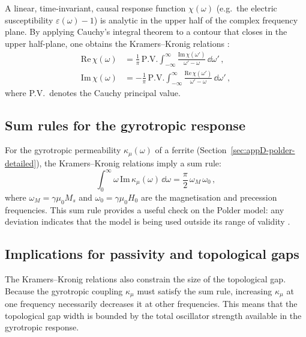 A linear, time-invariant, causal response function $\chi(\omega)$
(e.g.\ the electric susceptibility $\varepsilon(\omega)-1$) is
analytic in the upper half of the complex frequency plane.  By
applying Cauchy's integral theorem to a contour that closes in the
upper half-plane, one obtains the Kramers--Kronig relations
\cite{raman2010photonic,nittis2020equivalence}:
\begin{align}
  \mathrm{Re}\,\chi(\omega) &= \frac{1}{\pi}\,
  \mathrm{P.V.}\!\int_{-\infty}^{\infty}
  \frac{\mathrm{Im}\,\chi(\omega')}{\omega'-\omega}\,\dd\omega'\,,
  \label{eq:appD-kk-real-causality}\\
  \mathrm{Im}\,\chi(\omega) &= -\frac{1}{\pi}\,
  \mathrm{P.V.}\!\int_{-\infty}^{\infty}
  \frac{\mathrm{Re}\,\chi(\omega')}{\omega'-\omega}\,\dd\omega'\,,
  \label{eq:appD-kk-imag-causality}
\end{align}
where P.V.\ denotes the Cauchy principal value.

\subsection{Sum rules for the gyrotropic response}
\label{sec:appD-sum-rules}

For the gyrotropic permeability $\kappa_\mu(\omega)$ of a ferrite
(Section~\ref{sec:appD-polder-detailed}), the Kramers--Kronig relations imply
a sum rule:
\begin{equation}\label{eq:appD-kappa-sum-rule}
  \int_0^\infty \omega\,\mathrm{Im}\,\kappa_\mu(\omega)\,\dd\omega
  = \frac{\pi}{2}\,\omega_M\,\omega_0\,,
\end{equation}
where $\omega_M=\gamma\mu_0 M_s$ and $\omega_0=\gamma\mu_0 H_0$ are
the magnetisation and precession frequencies.  This sum rule provides
a useful check on the Polder model: any deviation indicates that the
model is being used outside its range of validity
\cite{nature2026observation,gangaraj2016berry}.

\subsection{Implications for passivity and topological gaps}
\label{sec:appD-passivity-topology}

The Kramers--Kronig relations also constrain the size of the
topological gap.  Because the gyrotropic coupling $\kappa_\mu$ must
satisfy the sum rule, increasing $\kappa_\mu$ at one frequency
necessarily decreases it at other frequencies.  This means that the
topological gap width is bounded by the total oscillator strength
available in the gyrotropic response.

